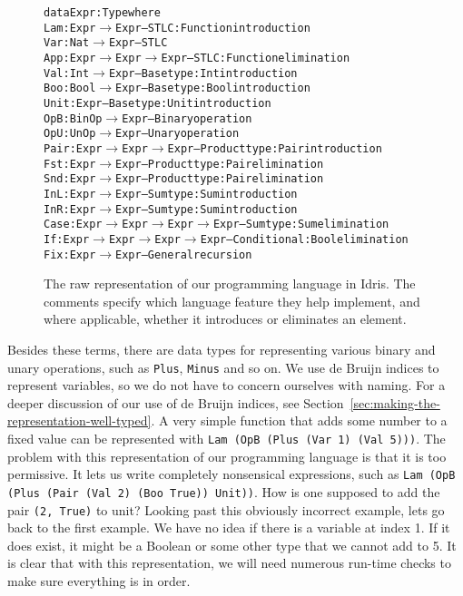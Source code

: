 \begin{center}
\begin{figure}
\begin{alltt}
data Expr : Type where
  Lam  : Expr \(\to\) Expr                 -- STLC: Function introduction
  Var  : Nat \(\to\) Expr                  -- STLC
  App  : Expr \(\to\) Expr \(\to\) Expr         -- STLC: Function elimination
  Val  : Int \(\to\) Expr                  -- Base type: Int introduction
  Boo  : Bool \(\to\) Expr                 -- Base type: Bool introduction
  Unit : Expr                         -- Base type: Unit introduction
  OpB  : BinOp \(\to\) Expr                -- Binary operation
  OpU  : UnOp \(\to\) Expr                 -- Unary operation
  Pair : Expr \(\to\) Expr \(\to\) Expr         -- Product type: Pair introduction
  Fst  : Expr \(\to\) Expr                 -- Product type: Pair elimination
  Snd  : Expr \(\to\) Expr                 -- Product type: Pair elimination
  InL  : Expr \(\to\) Expr                 -- Sum type: Sum introduction
  InR  : Expr \(\to\) Expr                 -- Sum type: Sum introduction
  Case : Expr \(\to\) Expr \(\to\) Expr \(\to\) Expr -- Sum type: Sum elimination
  If   : Expr \(\to\) Expr \(\to\) Expr \(\to\) Expr -- Conditional: Bool elimination
  Fix  : Expr \(\to\) Expr                 -- General recursion
\end{alltt}
\caption{The raw representation of our programming language in Idris. The comments specify which language feature they help implement, and where applicable, whether it introduces or eliminates an element.}
\label{fig:rstlc}
\end{figure}
\end{center}

Besides these terms, there are data types for representing various binary and unary operations, such as \texttt{Plus}, \texttt{Minus} and so on. We use de Bruijn indices to represent variables, so we do not have to concern ourselves with naming. For a deeper discussion of our use of de Bruijn indices, see Section~\ref{sec:making-the-representation-well-typed}. A very simple function that adds some number to a fixed value can be represented with \texttt{Lam (OpB (Plus (Var 1) (Val 5)))}. The problem with this representation of our programming language is that it is too permissive. It lets us write completely nonsensical expressions, such as \texttt{Lam (OpB (Plus (Pair (Val 2) (Boo True)) Unit))}. How is one supposed to add the pair \texttt{(2, True)} to unit? Looking past this obviously incorrect example, lets go back to the first example. We have no idea if there is a variable at index 1. If it does exist, it might be a Boolean or some other type that we cannot add to 5. It is clear that with this representation, we will need numerous run-time checks to make sure everything is in order. 

